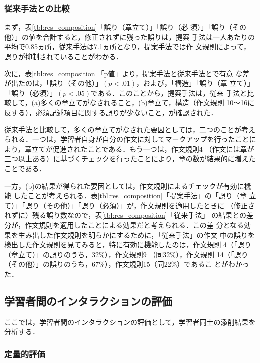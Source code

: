 \documentclass[japanese]{jnlp_1.4}
\def\mod{}
\begin{document}
{\mod
\subsubsection{従来手法との比較}
\label{ssse:hikaku}

まず，表\ref{tbl:res_composition}「誤り（章立て）」「誤り（必
須）」「誤り（その他）」の値を合計すると，修正されずに残った誤りは，提案
手法は一人あたりの平均で0.85ヵ所，従来手法は7.1ヵ所となり，提案手法では作
文規則によって，誤りが抑制されていることがわかる．

次に，表\ref{tbl:res_composition}「p値」より，提案手法と従来手法とで有意
な差が出たのは，「誤り（その他）」$(p<.01)$，および，「構造」「誤り（章
立て）」「誤り（必須）」$(p<.05)$である．このことから，提案手法は，従来
手法と比較して，(a)多くの章立てがなされること，(b)章立て，構造（作文規則
10〜16に反する），必須記述項目に関する誤りが少ないこと，が確認された．

従来手法と比較して，多くの章立てがなされた要因としては，二つのことが考え
られる．一つは，学習者自身が自分の作文に対してマークアップを行ったことに
より，章立てが促進されたことである．もう一つは，作文規則4 （作文には章が
三つ以上ある）に基づくチェックを行ったことにより，章の数が結果的に増えた
ことである．

一方，(b)の結果が得られた要因としては，作文規則によるチェックが有効に機能
したことが考えられる．表\ref{tbl:res_composition}「提案手法」の「誤り（章
立て）」「誤り（その他）」「誤り（必須）」が，作文規則を適用したときに
（修正されずに）残る誤り数なので，表\ref{tbl:res_composition}「従来手法」
の結果との差分が，作文規則を適用したことによる効果だと考えられる．この差
分となる効果を生み出した作文規則を明らかにするために，「従来手法」の作文
中の誤りを検出した作文規則を見てみると，特に有効に機能したのは，作文規則
4（「誤り（章立て）」の誤りのうち，32\%），作文規則9 （同32\%），作文規則
14（「誤り（その他）」の誤りのうち，67\%），作文規則15（同22\%）であるこ
とがわかった．} 


\subsection{学習者間のインタラクションの評価}

ここでは，学習者間のインタラクションの評価として，学習者同士の添削結果を
分析する．

\subsubsection{定量的評価}
\label{sssec:u2u_teiryo}
\end{document}
